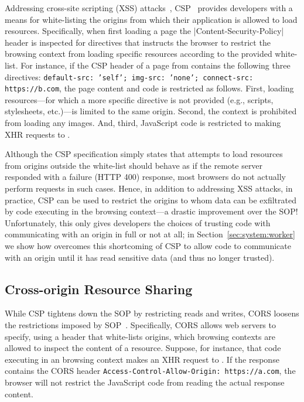 Addressing cross-site scripting (XSS) attacks~,
CSP~ provides developers with a means for
white-listing the origins from which their application is allowed to
load resources.
%
Specifically, when first loading a page the
\js|Content-Security-Policy| header is inspected for directives that
instructs the browser to restrict the browsing context from loading
specific resources according to the provided white-list.
%
For instance, if the CSP header of a page from  contains
the following three directives:
%
\texttt{default-src: 'self'; img-src: 'none'; connect-src:
https://b.com},
%
the page content and code is restricted as follows.
%
First, loading resources---for which a more specific directive is not
provided (e.g., scripts, stylesheets, etc.)---is limited to the same
origin.
%
Second, the context is prohibited from loading any images.
%
And, third, JavaScript code is restricted to making XHR requests to
.

Although the CSP specification simply states that attempts to load
resources from origins outside the white-list should behave as if the
remote server responded with a failure (HTTP 400) response, most
browsers do not actually perform requests in such cases.
%
Hence, in addition to addressing XSS attacks, in practice, CSP can
be used to restrict the origins to whom data can be exfiltrated by
code executing in the browsing context---a drastic improvement over
the SOP!
%
Unfortunately, this only gives developers the choices of trusting code
with communicating with an origin in full or not at all;
%
in Section~\ref{sec:system:worker} we show how \sys{} overcomes this
shortcoming of CSP to allow code to communicate with an origin until
it has read sensitive data (and thus no longer trusted).


\subsection{Cross-origin Resource Sharing} 
\label{sec:background:cors}

While CSP tightens down the SOP by restricting reads and writes, CORS
loosens the restrictions imposed by SOP~\cite{VanKesteren2012}.
%
Specifically, CORS allows web servers to specify, using a header that
white-lists origins, which browsing contexts are allowed to inspect
the content of a resource.
%
Suppose, for instance, that code executing in an  browsing
context makes an XHR request to .
%
If the response contains the CORS header
\texttt{Access-Control-Allow-Origin: https://a.com}, the browser will
not restrict the JavaScript code from reading the actual response
content.

